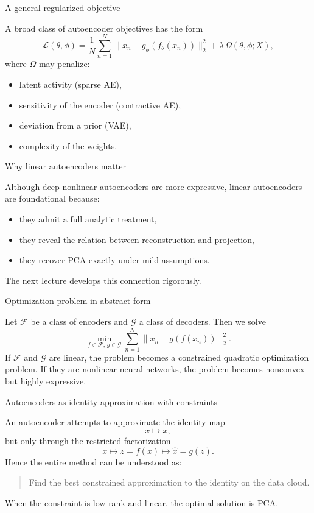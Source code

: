 \documentclass[aspectratio=169]{beamer}
\begin{document}
\begin{frame}{A general regularized objective}

A broad class of autoencoder objectives has the form
\[
\mathcal{L}(\theta,\phi)
=
\frac{1}{N}\sum_{n=1}^N \|x_n-g_\phi(f_\theta(x_n))\|_2^2
+
\lambda\,\Omega(\theta,\phi;X),
\]
where \(\Omega\) may penalize:
\begin{itemize}
\item latent activity (sparse AE),
\item sensitivity of the encoder (contractive AE),
\item deviation from a prior (VAE),
\item complexity of the weights.
\end{itemize}

\end{frame}

\begin{frame}{Why linear autoencoders matter}

Although deep nonlinear autoencoders are more expressive, linear autoencoders are foundational because:
\begin{itemize}
\item they admit a full analytic treatment,
\item they reveal the relation between reconstruction and projection,
\item they recover PCA exactly under mild assumptions.
\end{itemize}
The next lecture develops this connection rigorously.

\end{frame}

\begin{frame}{Optimization problem in abstract form}

Let \(\mathcal{F}\) be a class of encoders and \(\mathcal{G}\) a class of decoders. Then we solve
\[
\min_{f\in\mathcal{F},\, g\in\mathcal{G}}
\sum_{n=1}^N \|x_n-g(f(x_n))\|_2^2.
\]
If \(\mathcal{F}\) and \(\mathcal{G}\) are linear, the problem becomes a constrained quadratic optimization problem.
If they are nonlinear neural networks, the problem becomes nonconvex but highly expressive.

\end{frame}

\begin{frame}{Autoencoders as identity approximation with constraints}

An autoencoder attempts to approximate the identity map
\[
x \mapsto x,
\]
but only through the restricted factorization
\[
x \mapsto z=f(x)\mapsto \hat x=g(z).
\]
Hence the entire method can be understood as:
\begin{quote}
Find the best constrained approximation to the identity on the data cloud.
\end{quote}
When the constraint is low rank and linear, the optimal solution is PCA.

\end{frame}
\end{document}
